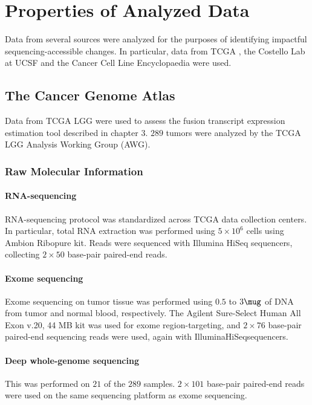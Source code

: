 \chapter{Properties of Analyzed Data}

Data from several sources were analyzed for the purposes of
identifying impactful sequencing-accessible changes. In particular,
data from TCGA \cite{_comprehensive_2015}, the Costello Lab at
UCSF\cite{johnson_mutational_2014} and the Cancer Cell Line
Encyclopaedia\cite{barretina_cancer_2012} were used.

\section{The Cancer Genome Atlas}

Data from TCGA LGG were used to assess the fusion transcript
expression estimation tool described in chapter 3. $289$ tumors were
analyzed by the TCGA LGG Analysis Working Group (AWG).

\subsection{Raw Molecular Information}

\subsubsection{RNA-sequencing}
RNA-sequencing protocol was standardized across TCGA data collection
centers. In particular, total RNA extraction was performed using
$5 \times 10^6$ cells using Ambion\textsuperscript{\textregistered}
Ribopure\textsuperscript{\texttrademark} kit. Reads were sequenced
with Illumina\textsuperscript{\textregistered}
HiSeq\textsuperscript{\texttrademark} sequencers, collecting
$2 \times 50$ base-pair paired-end reads.

\subsubsection{Exome sequencing}
Exome sequencing on tumor tissue was performed using $0.5$ to $3 \mug$
of DNA from tumor and normal blood, respectively. The Agilent\reg
Sure-Select Human All Exon \tm v.20, 44 MB kit was used for exome
region-targeting, and $2 \times 76$ base-pair paired-end sequencing
reads were used, again with Illumina\reg HiSeq\tm sequencers.


\subsubsection{Deep whole-genome sequencing}
This was performed on $21$ of the $289$ samples. $2 \times 101$
base-pair paired-end reads were used on the same sequencing platform
as exome sequencing.

